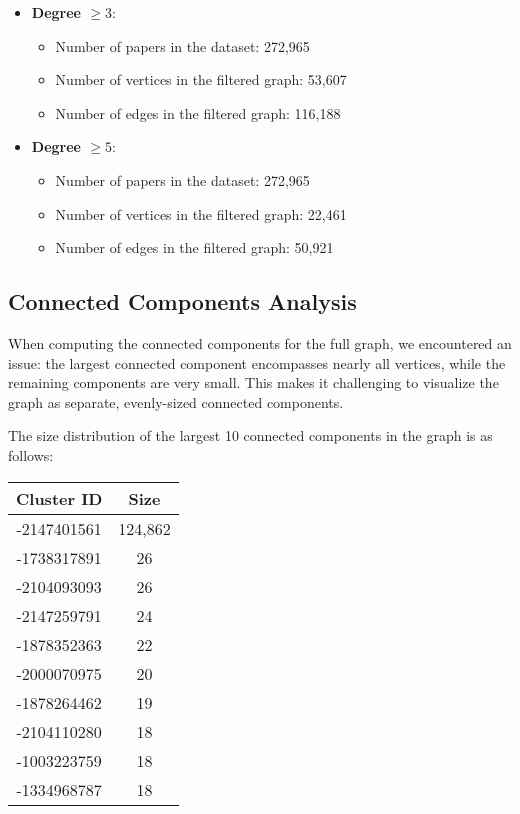 \documentclass[a4paper, 11pt]{article}
\begin{document}
\begin{itemize}
    \item \textbf{Degree $\geq 3$}:
    \begin{itemize}
        \item Number of papers in the dataset: 272,965
        \item Number of vertices in the filtered graph: 53,607
        \item Number of edges in the filtered graph: 116,188
    \end{itemize}
    \item \textbf{Degree $\geq 5$}:
    \begin{itemize}
        \item Number of papers in the dataset: 272,965
        \item Number of vertices in the filtered graph: 22,461
        \item Number of edges in the filtered graph: 50,921
    \end{itemize}
\end{itemize}

\subsection{Connected Components Analysis}

When computing the connected components for the full graph, we encountered an issue: the largest connected component encompasses nearly all vertices, while the remaining components are very small. This makes it challenging to visualize the graph as separate, evenly-sized connected components.

The size distribution of the largest 10 connected components in the graph is as follows:

\begin{center}
\begin{tabular}{|c|c|}
\hline
\textbf{Cluster ID} & \textbf{Size} \\
\hline
-2147401561 & 124,862 \\
-1738317891 & 26 \\
-2104093093 & 26 \\
-2147259791 & 24 \\
-1878352363 & 22 \\
-2000070975 & 20 \\
-1878264462 & 19 \\
-2104110280 & 18 \\
-1003223759 & 18 \\
-1334968787 & 18 \\
\hline
\end{tabular}
\end{center}
\end{document}

